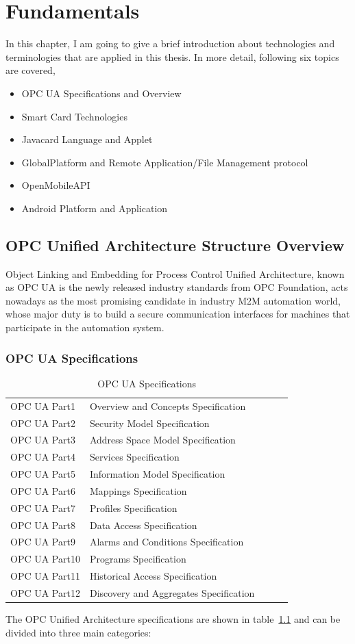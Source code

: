 \chapter{Fundamentals}

In this chapter, I am going to give a brief introduction about technologies and terminologies that are applied in this thesis. In more detail, following six topics are covered,
\begin{itemize}
\item OPC UA Specifications and Overview
\item Smart Card Technologies
\item Javacard Language and Applet
\item GlobalPlatform and Remote Application/File Management protocol
\item OpenMobileAPI
\item Android Platform and Application
\end{itemize}
\section{OPC Unified Architecture Structure Overview }
Object Linking and Embedding for Process Control Unified Architecture, known as OPC UA is the newly released industry standards from OPC Foundation, acts nowadays as the most promising candidate in industry M2M automation world, whose major duty is to build a secure communication interfaces for machines that participate in the automation system. 

\subsection{OPC UA Specifications} \label{secOPC}

\begin{table}[!htb]
\caption{OPC UA Specifications}
\centering
\begin{tabular}{lllll}
\hline\hline
OPC UA Part1 &Overview and Concepts Specification \\
OPC UA Part2 &Security Model Specification \\
OPC UA Part3 &Address Space Model Specification\\
OPC UA Part4 &Services Specification\\
OPC UA Part5 &Information Model Specification  \\
OPC UA Part6 &Mappings Specification \\
OPC UA Part7 &Profiles Specification \\
OPC UA Part8 &Data Access Specification  \\
OPC UA Part9 &Alarms and Conditions Specification \\
OPC UA Part10 &Programs Specification  \\
OPC UA Part11 &Historical Access Specification \\
OPC UA Part12 &Discovery and Aggregates Specification \\
\hline
\end{tabular}
\label{table:opcua}
\end{table}
The OPC Unified Architecture specifications are shown in table~\ref{table:opcua} and can be divided into three main categories:

